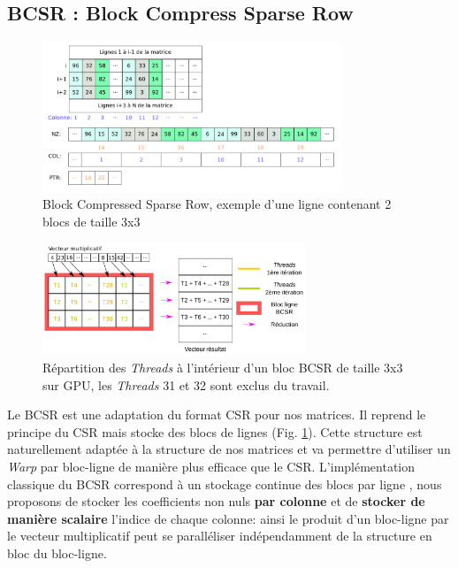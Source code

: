 \documentclass[renpar]{compas2013}
\begin{document}
 \subsection{BCSR : Block Compress Sparse Row}
   \begin{figure}\begin{center}
       \includegraphics[width=0.8\textwidth]{images/BCSR.pdf}
       \caption{Block Compressed Sparse Row, exemple d'une ligne contenant 2 blocs de taille 3x3}
       \label{bcsr_info}
   \end{center}\end{figure}
    \begin{figure}\begin{center}
        \includegraphics[width=0.7\textwidth]{images/distrib_bcsr.pdf}
        \caption{Répartition des \textit{Threads} à l'intérieur d'un bloc BCSR de taille 3x3
          sur GPU, les \textit{Threads} 31 et 32 sont exclus du travail.}
        \label{distrib_bcsr}
    \end{center}\end{figure}
   
   Le BCSR est une adaptation du format CSR pour nos matrices. Il reprend le
   principe du CSR mais stocke des blocs de lignes (Fig. \ref{bcsr_info}). Cette structure est
   naturellement adaptée à la structure de nos matrices et va permettre d'utiliser un
   \textit{Warp} par bloc-ligne de manière plus efficace que le CSR.
   L'implémentation classique du BCSR correspond à un stockage continue des blocs par ligne \cite{ChSi10MDAS},
   nous proposons de stocker les coefficients non nuls \textbf{par colonne} et
   de \textbf{stocker de manière scalaire} l'indice de chaque colonne: ainsi le produit d'un bloc-ligne
   par le vecteur multiplicatif peut se paralléliser indépendamment de la structure en bloc du
   bloc-ligne.
\end{document}
